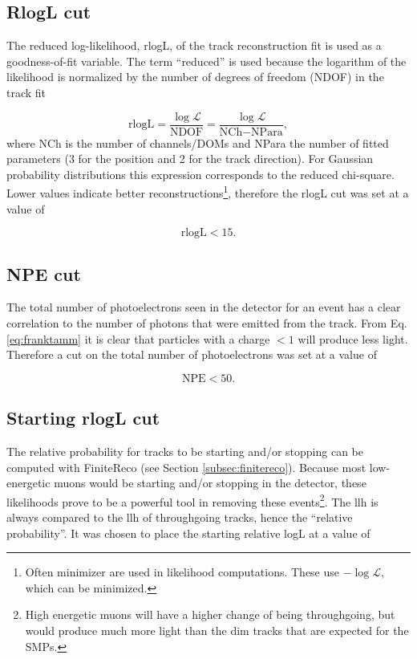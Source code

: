 \subsection{RlogL cut}
The reduced log-likelihood, rlogL, of the track reconstruction fit is used as a goodness-of-fit variable. The term ``reduced'' is used because the logarithm of the likelihood is normalized by the number of degrees of freedom (NDOF) in the track fit

\begin{equation}
\textrm{rlogL} = \frac{\log \mathcal{L}}{\textrm{NDOF}} = \frac{\log \mathcal{L}}{\textrm{NCh} - \textrm{NPara}},
\end{equation}
where NCh is the number of channels/DOMs and NPara the number of fitted parameters (3 for the position and 2 for the track direction). For Gaussian probability distributions this expression corresponds to the reduced chi-square. Lower values indicate better reconstructions\footnote{Often minimizer are used in likelihood computations. These use $-\log \mathcal{L}$, which can be minimized.}, therefore the rlogL cut was set at a value of 

\begin{equation}
\textrm{rlogL} < 15.
\end{equation}

\subsection{NPE cut}
The total number of photoelectrons seen in the detector for an event has a clear correlation to the number of photons that were emitted from the track. From Eq. \ref{eq:franktamm} it is clear that particles with a charge $< 1$ will produce less light. Therefore a cut on the total number of photoelectrons was set at a value of 

\begin{equation}
\textrm{NPE} < 50.
\end{equation} 


\subsection{Starting rlogL cut}
The relative probability for tracks to be starting and/or stopping can be computed with FiniteReco (see Section \ref{subsec:finitereco}). Because most low-energetic muons would be starting and/or stopping in the detector, these likelihoods prove to be a powerful tool in removing these events\footnote{High energetic muons will have a higher change of being throughgoing, but would produce much more light than the dim tracks that are expected for the SMPs.}. The llh is always compared to the llh of throughgoing tracks, hence the ``relative probability''. It was chosen to place the starting relative logL at a value of 

